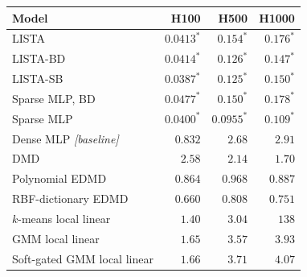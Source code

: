 \begin{tabular}[t]{@{}l rrr@{}}
\toprule
Model & H100 & H500 & H1000 \\
\midrule
LISTA & ${0.0413}^{\ast}$ & ${0.154}^{\ast}$ & ${0.176}^{\ast}$ \\
LISTA-BD & ${0.0414}^{\ast}$ & ${0.126}^{\ast}$ & ${0.147}^{\ast}$ \\
LISTA-SB & ${\mathbf{0.0387}}^{\ast}$ & ${0.125}^{\ast}$ & ${0.150}^{\ast}$ \\
Sparse MLP, BD & ${0.0477}^{\ast}$ & ${0.150}^{\ast}$ & ${0.178}^{\ast}$ \\
Sparse MLP \citep{fathi2024course} & ${0.0400}^{\ast}$ & ${\mathbf{0.0955}}^{\ast}$ & ${\mathbf{0.109}}^{\ast}$ \\
\midrule
Dense MLP \citep{lusch_deep_2018} \emph{[baseline]} & $0.832$ & $2.68$ & $2.91$ \\
\midrule
DMD & $2.58$ & $2.14$ & $1.70$ \\
Polynomial EDMD & $0.864$ & $0.968$ & $0.887$ \\
RBF-dictionary EDMD & $0.660$ & $0.808$ & $0.751$ \\
$k$-means local linear & $1.40$ & $3.04$ & $138$ \\
GMM local linear & $1.65$ & $3.57$ & $3.93$ \\
Soft-gated GMM local linear & $1.66$ & $3.71$ & $4.07$ \\
\bottomrule
\end{tabular}
